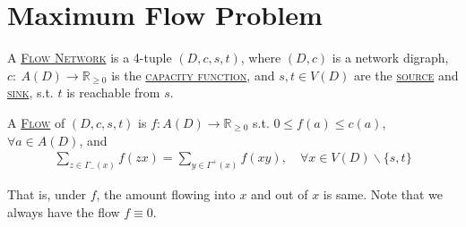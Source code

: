 \section{Maximum Flow Problem}
\begin{definition}
    A \uline{\textcolor{MarkerColour}{\textsc{Flow Network}}} is a 4-tuple $(D, c, s, t)$, where $(D, c)$ is a network digraph, $c:\ A(D)\to\mathbb{R}_{\geqslant 0}$ is the \uline{\textcolor{MarkerColour}{\textsc{capacity function}}}, and $s, t\in V(D)$ are the \uline{\textcolor{MarkerColour}{\textsc{source}}} and \uline{\textcolor{MarkerColour}{\textsc{sink}}}, s.t. $t$ is reachable from $s$.
\end{definition}

\begin{definition}
    A \uline{\textcolor{MarkerColour}{\textsc{Flow}}} of $(D, c, s, t)$ is $f: A(D)\to\mathbb{R}_{\geqslant 0}$ s.t. $0\leqslant f(a)\leqslant c(a)$, $\forall a\in A(D)$, and 
    \setcounter{equation}{1}
    \begin{align}
        \sum\limits_{z\in\Gamma_{-}(x)} f(zx) = \sum\limits_{y\in\Gamma^{+}(x)} f(xy), \quad \forall x\in V(D)\backslash \{s, t\} \label{3.2}
    \end{align}

   That is, under $f$, the amount flowing into $x$ and out of $x$ is same. Note that we always have the flow $f\equiv 0$.
\end{definition}

